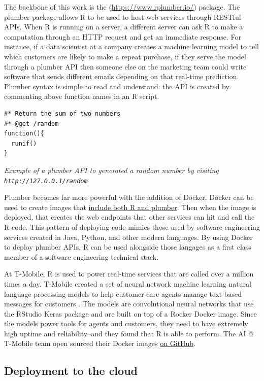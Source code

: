 The backbone of this work is the 
(\url{https://www.rplumber.io/}) package. The plumber package allows R
to be used to host web services through RESTful APIs. When R is running
on a server, a different server can ask R to make a computation through
an HTTP request and get an immediate response. For instance, if a data
scientist at a company creates a machine learning model to tell which
customers are likely to make a repeat purchase, if they serve the model
through a plumber API then someone else on the marketing team could
write software that sends different emails depending on that real-time
prediction. Plumber syntax is simple to read and understand: the API is
created by commenting above function names in an R script.

\begin{verbatim}
#* Return the sum of two numbers
#* @get /random
function(){
  runif()
}
\end{verbatim}

\emph{Example of a plumber API to generated a random number by visiting
\texttt{http://127.0.0.1/random}}

Plumber becomes far more powerful with the addition of Docker. Docker
can be used to create images that
\href{https://www.rplumber.io/docs/hosting.html\#docker}{include both R
and plumber}. Then when the image is deployed, that creates the web
endpoints that other services can hit and call the R code. This pattern
of deploying code mimics those used by software engineering services
created in Java, Python, and other modern languages. By using Docker to
deploy plumber APIs, R can be used alongside those langages as a first
class member of a software engineering technical stack.

At T-Mobile, R is used to power real-time services that are called over
a million times a day. T-Mobile created a set of neural network machine
learning natural language processing models to help customer care agents
manage text-based messages for customers
\citep{t-mobile_enterprise_2018}. The models are convolutional neural
networks that use the RStudio Keras package and are built on top of a
Rocker Docker image. Since the models power tools for agents and
customers, they need to have extremely high uptime and reliability--and
they found that R is able to perform. The AI @ T-Mobile team open
sourced their Docker images
\href{https://github.com/tmobile/r-tensorflow-api}{on GitHub}.

\hypertarget{deployment-to-the-cloud}{%
\subsection{Deployment to the cloud}\label{deployment-to-the-cloud}}

